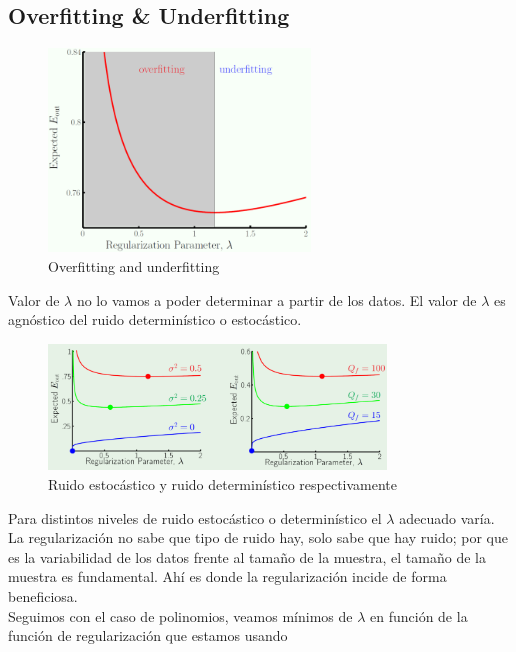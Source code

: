\documentclass[11pt,a4paper]{article}
\theoremstyle{definition}
\begin{document}
	\subsection{Overfitting \& Underfitting}
	\begin{figure}[H]
		\centering
		\includegraphics[width=0.62\textwidth]{images/over_under_fitting}
		\caption{Overfitting and underfitting}
	\end{figure}
	Valor de $\lambda$ no lo vamos a poder determinar a partir de los datos. El valor de $\lambda$ es agnóstico del ruido determinístico o estocástico.
	\begin{figure}[H]
		\centering
		\includegraphics[width=0.8\textwidth]{images/lambda_agn}
		\caption{Ruido estocástico y ruido determinístico respectivamente}
	\end{figure}
	Para distintos niveles de ruido estocástico o determinístico el $\lambda$ adecuado varía. La regularización no sabe que tipo de ruido hay, solo sabe que hay ruido; por que es la variabilidad de los datos frente al tamaño de la muestra, el tamaño de la muestra es fundamental. Ahí es donde la regularización incide de forma beneficiosa.\\
	
	Seguimos con el caso de polinomios, veamos mínimos de $\lambda$ en función de la función de regularización que estamos usando
	
\end{document}

